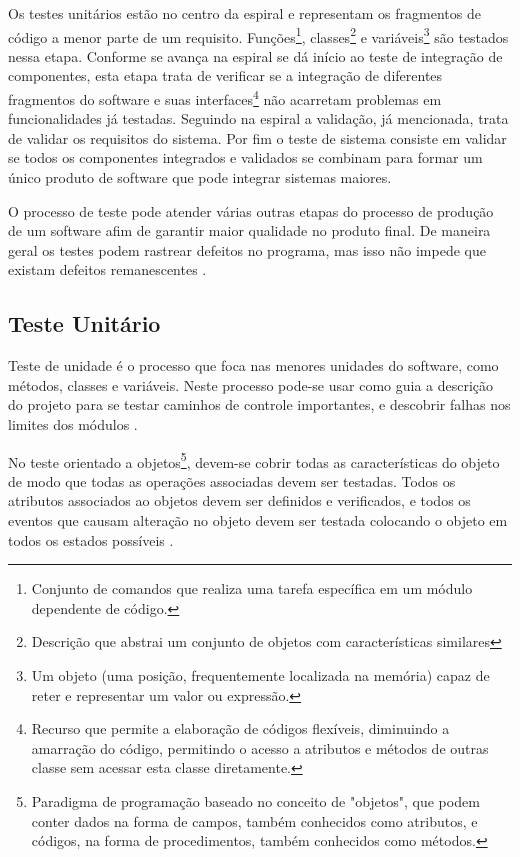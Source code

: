 Os testes unitários estão no centro da espiral e representam os fragmentos de código a menor parte de um requisito. Funções\footnote{Conjunto de comandos que realiza uma tarefa específica em um módulo dependente de código.}, classes\footnote{Descrição que abstrai um conjunto de objetos com características similares} e variáveis\footnote{Um objeto (uma posição, frequentemente localizada na memória) capaz de reter e representar um valor ou expressão. } são testados nessa etapa. Conforme se avança na espiral se dá início ao teste de integração de componentes, esta etapa trata de verificar se a integração de diferentes fragmentos do software e suas interfaces\footnote{Recurso que permite a elaboração de códigos flexíveis, diminuindo a amarração do código, permitindo o acesso a atributos e métodos de outras classe sem acessar esta classe diretamente.} não acarretam problemas em funcionalidades já testadas. Seguindo na espiral a validação, já mencionada, trata de validar os requisitos do sistema. Por fim o teste de sistema consiste em validar se todos os componentes integrados e validados se combinam para formar um único produto de software que pode integrar sistemas maiores.

 O processo de teste pode atender várias outras etapas do processo de produção de um software afim de garantir maior qualidade no produto final. De maneira geral os testes podem rastrear defeitos no programa, mas isso não impede que existam defeitos remanescentes \cite{SOMMER2011}.

\subsection{Teste Unitário}

Teste de unidade é o processo que foca nas menores unidades do software, como métodos, classes e variáveis. Neste processo pode-se usar como guia a descrição do projeto para se testar caminhos de controle importantes, e descobrir falhas nos limites dos módulos \cite{PRESMA2016}.

No teste orientado a objetos\footnote{Paradigma de programação baseado no conceito de "objetos", que podem conter dados na forma de campos, também conhecidos como atributos, e códigos, na forma de procedimentos, também conhecidos como métodos.}, devem-se cobrir todas as características  do objeto de modo que todas as operações associadas devem ser testadas. Todos os atributos associados ao objetos devem ser definidos e verificados, e todos os eventos que causam alteração no objeto devem ser testada colocando o objeto em todos os estados possíveis \cite{SOMMER2011}.

